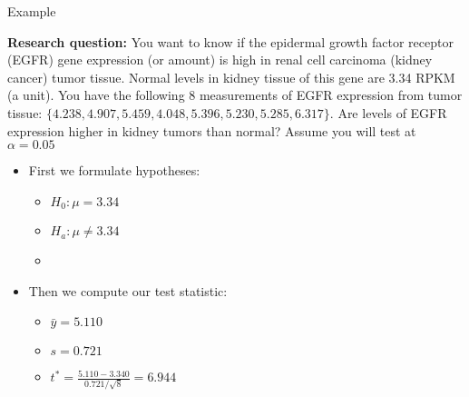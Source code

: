 \documentclass[xcolor=dvipsnames]{beamer}
\begin{document}
\begin{frame}{Example}

{\scriptsize  \textbf{Research question:} You want to know if the epidermal growth factor receptor (EGFR) gene expression (or amount) is high in renal cell carcinoma (kidney cancer) tumor tissue. Normal levels in kidney tissue of this gene are 3.34 RPKM (a unit). You have the following 8 measurements of EGFR expression from tumor tissue: $\{4.238, 4.907, 5.459, 4.048, 5.396, 5.230, 5.285, 6.317\}$. Are levels of EGFR expression higher in kidney tumors than normal? Assume you will test at $\alpha = 0.05$} \pause

	\begin{itemize}
		\item First we formulate hypotheses:  \pause
		\begin{itemize}
			\item $H_0: \mu = 3.34$  \pause
			\item $H_a: \mu \neq 3.34$  \pause
			\item[]
		\end{itemize}
	\item Then we compute our test statistic:  \pause
	\begin{itemize}
		\item $\bar{y} = 5.110$  \pause
		\item $s = 0.721$  \pause
		\item $t^* = \frac{5.110 - 3.340}{0.721 / \sqrt{8}} = 6.944$
	\end{itemize}
	\end{itemize}
\end{frame}
\end{document}
